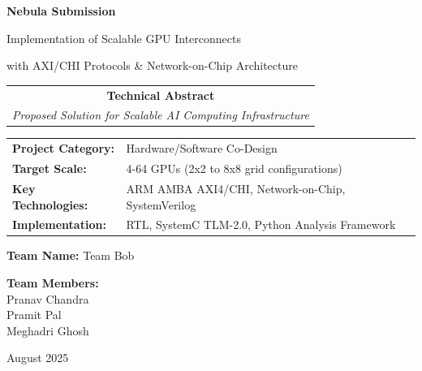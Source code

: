 \documentclass[11pt,a4paper]{article}
\begin{document}
\begin{titlepage}
    \centering
    \vspace*{2cm}
    
    {\Huge\textcolor{nebulablue}{\textbf{Nebula Submission}}}
    
    \vspace{0.5cm}
    {\Large\textcolor{nebulagray}{Implementation of Scalable GPU Interconnects}}
    
    \vspace{0.3cm}
    {\large\textcolor{nebulagray}{with AXI/CHI Protocols \& Network-on-Chip Architecture}}
    
    \vspace{2cm}
    
    \begin{tabular}{c}
        \textbf{\Large Technical Abstract} \\
        \textit{Proposed Solution for Scalable AI Computing Infrastructure}
    \end{tabular}
    
    \vspace{2cm}
    
    \begin{tabular}{ll}
        \textbf{Project Category:} & Hardware/Software Co-Design \\
        \textbf{Target Scale:} & 4-64 GPUs (2x2 to 8x8 grid configurations) \\
        \textbf{Key Technologies:} & ARM AMBA AXI4/CHI, Network-on-Chip, SystemVerilog \\
        \textbf{Implementation:} & RTL, SystemC TLM-2.0, Python Analysis Framework \\
    \end{tabular}
	\vspace{2cm}


	{\large \textbf{Team Name: } Team Bob} \\
	\vspace{1cm}

	{\large \textbf{Team Members: } \\\vspace{0.5cm} Pranav Chandra \\ Pramit Pal \\ Meghadri Ghosh}

	
    
    \vfill
    
    {\large August 2025}
\end{titlepage}
\end{document}
